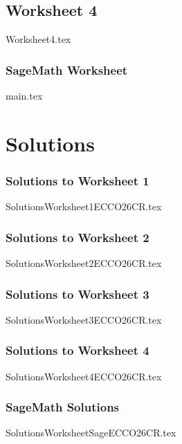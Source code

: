 \documentclass[12pt]{memoir}
\newcommand{\worksheetnumbering}{%
  \renewcommand{\theenumi}{\arabic{enumi}}%
  \renewcommand{\labelenumi}{\theenumi.}%
  \renewcommand{\theenumii}{\alph{enumii}}%
  \renewcommand{\labelenumii}{(\theenumii)}%
}
\newcommand{\worksheetimportsetup}{%
  \let\maketitle\relax
  \let\section\subsection
  \let\bf\bfseries
  \worksheetnumbering
}
\begin{document}
\clearpage
\section{Worksheet 4}
\begingroup
\worksheetimportsetup
{Worksheet4.tex}
\endgroup

\clearpage
\section{SageMath Worksheet}
\begingroup
\worksheetimportsetup
{main.tex}
\endgroup

\chapter{Solutions}

\section{Solutions to Worksheet 1}
\begingroup
\let\maketitle\relax
\worksheetnumbering
{SolutionsWorksheet1ECCO26CR.tex}
\endgroup

\clearpage
\section{Solutions to Worksheet 2}
\begingroup
\let\maketitle\relax
\worksheetnumbering
{SolutionsWorksheet2ECCO26CR.tex}
\endgroup

\clearpage
\section{Solutions to Worksheet 3}
\begingroup
\let\maketitle\relax
\worksheetnumbering
{SolutionsWorksheet3ECCO26CR.tex}
\endgroup

\clearpage
\section{Solutions to Worksheet 4}
\begingroup
\let\maketitle\relax
\worksheetnumbering
{SolutionsWorksheet4ECCO26CR.tex}
\endgroup

\clearpage
\section{SageMath Solutions}
\begingroup
\let\maketitle\relax
\worksheetnumbering
{SolutionsWorksheetSageECCO26CR.tex}
\endgroup
\end{document}
